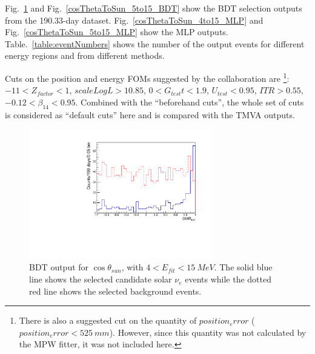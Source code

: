 Fig.~\ref{cosThetaToSun_4to15_BDT} and Fig.~\ref{cosThetaToSun_5to15_BDT} show the BDT selection outputs from the 190.33-day dataset. Fig.~\ref{cosThetaToSun_4to15_MLP} and Fig.~\ref{cosThetaToSun_5to15_MLP} show the MLP outputs. 
Table.~\ref{table:eventNumbers} shows the number of the output events for different energy regions and from different methods.

Cuts on the position and energy FOMs suggested by the collaboration\cite{morganFOM} are \footnote{There is also a suggested cut on the quantity of $position_error$ ($position_error<525~mm$). However, since this quantity was not calculated by the MPW fitter, it was not included here.}: $-11<Z_{factor}<1$, $scaleLogL>10.85$, $0<G_{test}t<1.9$, $U_{test}<0.95$, $ITR>0.55$, $-0.12<\beta_{14}<0.95$. Combined with the ``beforehand cuts'', the whole set of cuts is considered as ``default cuts'' here and is compared with the TMVA outputs.

%

\begin{figure}[!htb]
	\centering
	\includegraphics[width=8cm]{cosThetaToSun_4to15_BDT.pdf}
	\caption{BDT output for $\cos\theta_{sun}$, with $4<E_{fit}<15~MeV$. The solid blue line shows the selected candidate solar $\nu_e$ events while the dotted red line shows the selected background events.}
	\label{cosThetaToSun_4to15_BDT}
\end{figure}

